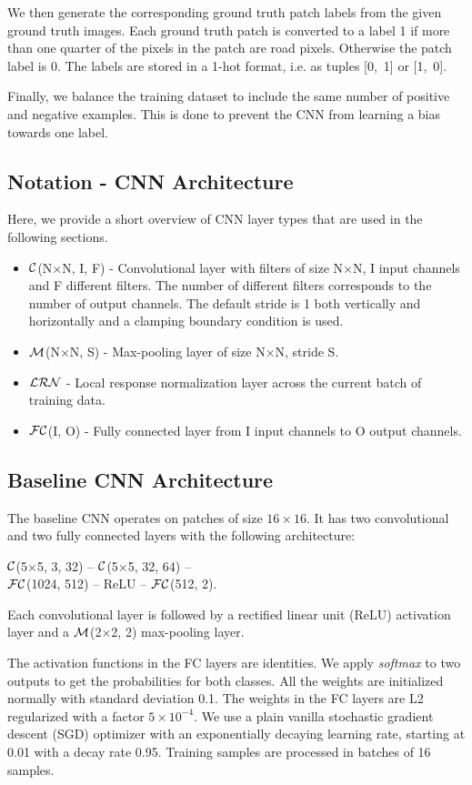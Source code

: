 \documentclass[10pt,conference,compsocconf]{IEEEtran}
\newcommand{\conv}[3]{$ \cal{C} $(#1$ \times  $#1, #2, #3)}
\newcommand{\maxpool}[2]{$ \cal{M} $(#1$ \times $#1, #2)}
\newcommand{\lrn}{$ \cal{LRN}~$}
\newcommand{\fc}[2]{$ \cal{FC} $(#1, #2)}
\begin{document}
We then generate the corresponding ground truth patch labels from the given ground truth images. Each ground truth patch is converted to a label 1 if more than one quarter of the pixels in the patch are road pixels. Otherwise the patch label is 0. The labels are stored in a 1-hot format, i.e. as tuples \mbox{[0, 1]} or \mbox{[1, 0]}.

Finally, we balance the training dataset to include the same number of positive and negative examples. This is done to prevent the CNN from learning a bias towards one label.

\subsection{Notation - CNN Architecture}
Here, we provide a short overview of CNN layer types that are used in the following sections.
\begin{itemize}
	\item \conv{N}{I}{F} - Convolutional layer with filters of size N$ \times $N, I input channels and F different filters. The number of different filters corresponds to the number of output channels. The default stride is 1 both vertically and horizontally and a clamping boundary condition is used.
	\item \maxpool{N}{S} - Max-pooling layer of size N$ \times $N, stride S.
	\item \lrn - Local response normalization layer across the current batch of training data.
	\item \fc{I}{O} - Fully connected layer from I input channels to O output channels.
\end{itemize}

\subsection{Baseline CNN Architecture}
\label{subsec:baselineCNN}
The baseline CNN operates on patches of size $16 \times 16$. It has two convolutional and two fully connected layers with the following architecture:
\begin{center}
	\conv{5}{3}{32} -- \conv{5}{32}{64} -- \\ 
	\fc{1024}{512} -- ReLU -- \fc{512}{2}.
\end{center}
Each convolutional layer is followed by a rectified linear unit (ReLU) activation layer and a \maxpool{2}{2} max-pooling layer.

The activation functions in the FC layers are identities. We apply \textit{softmax} to two outputs to get the probabilities for both classes. All the weights are initialized normally with standard deviation 0.1. The weights in the FC layers are L2 regularized with a factor $ 5 \times 10^{-4} $. We use a plain vanilla stochastic gradient descent (SGD) optimizer with an exponentially decaying learning rate, starting at 0.01 with a decay rate 0.95. Training samples are processed in batches of 16 samples.
\end{document}
